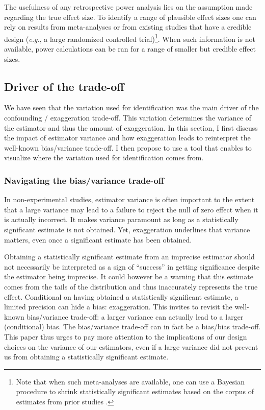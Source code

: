 \documentclass[usletter, 12pt]{article}
\begin{document}
				The usefulness of any retrospective power analysis lies on the assumption made regarding the true effect size. To identify a range of plausible effect sizes one can rely on results from meta-analyses or from existing studies that have a credible design (\textit{e.g.}, a large randomized controlled trial)\footnote{Note that when such meta-analyses are available, one can use a Bayesian procedure to shrink statistically significant estimates based on the corpus of estimates from prior studies \cite{zwet_proposal_2021, zwet_significance_2021, zwet_statistical_2021} .}. When such information is not available, power calculations can be ran for a range of smaller but credible effect sizes.
				
		\subsection{Driver of the trade-off}
		
			We have seen that the variation used for identification was the main driver of the confounding / exaggeration trade-off. This variation determines the variance of the estimator and thus the amount of exaggeration. In this section, I first discuss the impact of estimator variance and how exaggeration leads to reinterpret the well-known bias/variance trade-off. I then propose to use a tool that enables to visualize where the variation used for identification comes from.
		
			\subsubsection{Navigating the bias/variance trade-off}
			
				In non-experimental studies, estimator variance is often important to the extent that a large variance may lead to a failure to reject the null of zero effect when it is actually incorrect. It makes variance paramount as long as a statistically significant estimate is not obtained. Yet, exaggeration underlines that variance matters, even once a significant estimate has been obtained. 
			
				 Obtaining a statistically significant estimate from an imprecise estimator should not necessarily be interpreted as a sign of ``success'' in getting significance despite the estimator being imprecise. It could however be a warning that this estimate comes from the tails of the distribution and thus inaccurately represents the true effect. Conditional on having obtained a statistically significant estimate, a limited precision can hide a bias: exaggeration. This invites to revisit the well-known bias/variance trade-off: a larger variance can actually lead to a larger (conditional) bias. The bias/variance trade-off can in fact be a bias/bias trade-off. This paper thus urges to pay more attention to the implications of our design choices on the variance of our estimators, even if a large variance did not prevent us from obtaining a statistically significant estimate.
			
\end{document}
